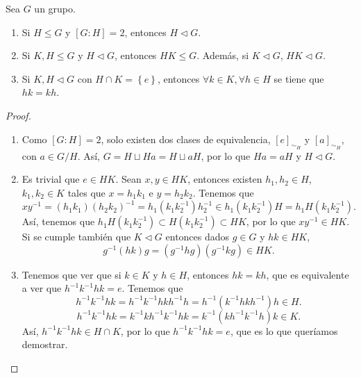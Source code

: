 \begin{prop}
Sea $\displaystyle G $ un grupo. 
\begin{enumerate}
	\item Si $\displaystyle H \leq G $ y $\displaystyle [G:H] = 2 $, entonces $\displaystyle H \lhd G $.
	\item Si $\displaystyle K,H \leq G $ y $\displaystyle H \lhd G $, entonces $\displaystyle HK \leq G $. Además, si $\displaystyle K\lhd G $, $\displaystyle HK \lhd G $.
	\item Si $\displaystyle K,H \lhd G $ con $\displaystyle H \cap K = \left\{ e\right\}  $, entonces $\displaystyle \forall k \in K, \forall h \in H $ se tiene que $\displaystyle h k = kh $.
\end{enumerate}
\end{prop}
\begin{proof}
	\begin{enumerate}
	\item Como $\displaystyle [G:H] = 2 $, solo existen dos clases de equivalencia, $\displaystyle [e]_{\sim_{H}} $ y $\displaystyle [a]_{\sim_{H}} $, con $\displaystyle a \in G/H $. Así, $\displaystyle G = H \sqcup Ha = H \sqcup aH $, por lo que $\displaystyle Ha = aH $ y $\displaystyle H \lhd G $.
	\item Es trivial que $\displaystyle e \in HK $. Sean $\displaystyle x,y \in HK $, entonces existen $\displaystyle h_{1}, h_{2} \in H $, $\displaystyle k_{1}, k_{2} \in K $ tales que $\displaystyle x = h_{1}k_{1} $ e $\displaystyle y = h_{2}k_{2} $. Tenemos que
		\[xy^{-1} = \left(h_{1}k_{1}\right)\left(h_{2}k_{2}\right)^{-1} = h_{1}\left(k_{1}k_{2}^{-1}\right)h_{2}^{-1} \in h_{1}\left(k_{1}k_{2}^{-1}\right)  H = h_{1}H\left(k_{1}k_{2}^{-1}\right) .\]
Así, tenemos que $\displaystyle h_{1}H\left(k_{1}k_{2}^{-1}\right) \subset H\left(k_{1}k_{2}^{-1}\right) \subset HK $, por lo que $\displaystyle xy^{-1} \in HK $. Si se cumple también que $\displaystyle K \lhd G $ entonces dados $\displaystyle g \in G $ y $\displaystyle hk \in HK $,
\[g^{-1}\left(hk\right)g = \left(g^{-1}hg\right)\left(g^{-1}kg\right) \in HK .\]
\item Tenemos que ver que si $\displaystyle k \in K $ y $\displaystyle h \in H $, entonces $\displaystyle hk = kh $, que es equivalente a ver que $\displaystyle h^{-1}k^{-1}hk = e $. Tenemos que
	\[h^{-1}k^{-1}hk = h^{-1}k^{-1}hkh^{-1}h = h^{-1}\left(k^{-1}hkh^{-1}\right)h \in H .\]
	\[h^{-1}k^{-1}hk = k^{-1}k h^{-1}k^{-1}hk = k^{-1}\left(kh^{-1}k^{-1}h\right)k \in K .\]
	Así, $\displaystyle h^{-1}k^{-1}hk \in H \cap K $, por lo que $\displaystyle h^{-1}k^{-1}hk = e $, que es lo que queríamos demostrar. 
	\end{enumerate}
\end{proof}
